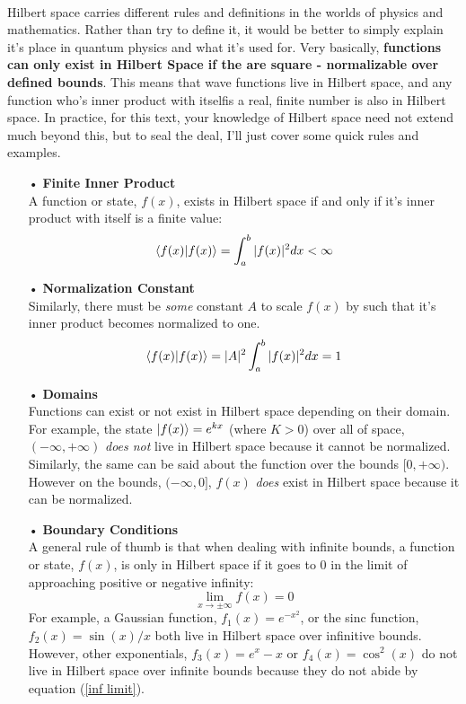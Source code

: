 \documentclass[12pt,letterpaper]{book}
\begin{document}
\paragraph*{}Hilbert space carries different rules and definitions in the worlds of physics and mathematics. Rather than try to define it, it would be better to simply explain it's place in quantum physics and what it's used for. Very basically, \textbf{functions can only exist in Hilbert Space if the  are square - normalizable over defined bounds}. This means that wave functions live in Hilbert space, and any function who's inner product with itselfis a real, finite number is also in Hilbert space. In practice, for this text, your knowledge of Hilbert space need not extend much beyond this, but to seal the deal, I'll just cover some quick rules and examples.
\begin{enumerate}
\item[•]\textbf{Finite Inner Product}\\
A function or state, $f(x)$, exists in Hilbert space if and only if it's inner product with itself is a finite value:
\begin{equation}
\label{hilbert}
\braket{f(x)}{f(x)} = \int_a^b |f(x)|^2 dx < \infty
\end{equation}
\item[•]\textbf{Normalization Constant}\\
Similarly, there must be \textit{some} constant $A$ to scale $f(x)$ by such that it's inner product becomes normalized to one.
\begin{equation}
\braket{f(x)}{f(x)} = |A|^2\int_a^b |f(x)|^2 dx =1
\end{equation}
\item[•]\textbf{Domains}\\
Functions can exist or not exist in Hilbert space depending on their domain. For example, the state 
$\ket{f(x)} = e^{kx}$ (where $K > 0$) over all of space, $(-\infty,+\infty)$ \textit{does not} live in Hilbert space because it cannot be normalized. Similarly, the same can be said about the function over the bounds $[0,+\infty)$. However on the bounds, $(-\infty,0]$, $f(x)$ \textit{does} exist in Hilbert space because it can be normalized.
\item[•]\textbf{Boundary Conditions}\\
A general rule of thumb is that when dealing with infinite bounds, a function or state, $f(x)$, is only in Hilbert space if it goes to $0$ in the limit of approaching positive or negative infinity:
\begin{equation}
\label{inf limit}
\lim_{x \rightarrow \pm \infty} f(x) = 0
\end{equation}
For example, a Gaussian function, $f_1(x) = e^{-x^2}$, or the sinc function, $f_2(x) = \sin(x)/x$ both live in Hilbert space over infinitive bounds. However, other exponentials, $f_3(x) = e^{x} - x$ or $f_4(x) = \cos^2(x)$ do not live in Hilbert space over infinite bounds because they do not abide by equation (\ref{inf limit}).
\end{enumerate}
\end{document}
